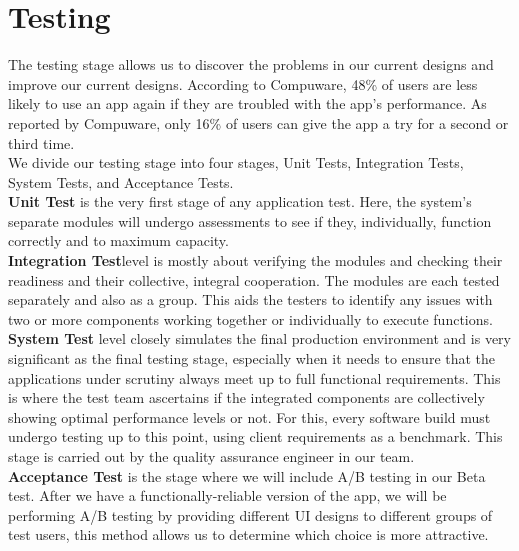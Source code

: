 \section{Testing}
The testing stage allows us to discover the problems in our current designs and improve our current designs. 
According to Compuware, 48\% of users are less likely to use an app again if they are troubled with the app’s performance.
As reported by Compuware, only 16\% of users can give the app a try for a second or third time. 
\\
We divide our testing stage into four stages, Unit Tests, Integration Tests, System Tests, and Acceptance Tests.
\\\textbf{Unit Test} is the very first stage of any application test. Here, the system’s separate modules will undergo assessments to see if they, individually, function correctly and to maximum capacity. 
\\\textbf{Integration Test}level is mostly about verifying the modules and checking their readiness and their collective, integral cooperation. The modules are each tested separately and also as a group. This aids the testers to identify any issues with two or more components working together or individually to execute functions.
\\\textbf{System Test} level closely simulates the final production environment and is very significant as the final testing stage, especially when it needs to ensure that the applications under scrutiny always meet up to full functional requirements. 
This is where the test team ascertains if the integrated components are collectively showing optimal performance levels or not. For this, every software build must undergo testing up to this point, using client requirements as a benchmark. 
This stage is carried out by the quality assurance engineer in our team.
\\\textbf{Acceptance Test} is the stage where we will include A/B testing in our Beta test. After we have a functionally-reliable version of the app, 
we will be performing A/B testing by providing different UI designs to different groups of test users, this method allows us to 
determine which choice is more attractive.



